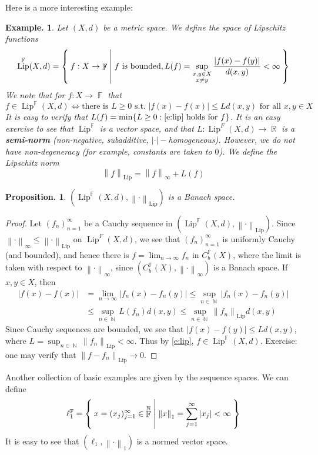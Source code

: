 \documentclass[11pt, a4paper]{memoir}
\DeclareMathOperator{\N}{{\mathbb{N}}}
\DeclareMathOperator{\R}{{\mathbb{R}}}
\DeclareMathOperator{\F}{{\mathbb{F}}}
\newcommand{\norm}[1]{\ensuremath{\left\lVert#1\right\rVert}}
\newcommand{\abs}[1]{\ensuremath{\left\lvert#1\right\rvert}}
\theoremstyle{change}
\newtheorem{proposition}[theorem]{Proposition.}
\theoremstyle{plain}
\theoremstyle{nonumberplain}
\newtheorem{example}{Example.}
\newtheorem{proof}{Proof}
\DeclareMathOperator{\Lip}{Lip}
\numberwithin{equation}{section}
\begin{document}
Here is a more interesting example:
\begin{example}
    Let $(X,d)$ be a metric space.
    We define the space of Lipschitz functions
    \begin{equation*}
        \Lip^{\F}(X,d)=\Set{f:X\to\F | f\text{ is bounded}, L(f)=\sup_{\substack{x,y\in X\\x\neq y}}\frac{|f(x)-f(y)|}{d(x,y)}<\infty}
    \end{equation*}
    We note that for $f:X\to\F$ that
    \begin{equation}\label{e:lip}
        f\in\Lip^{\F}(X,d)\Leftrightarrow\text{there is }L\geq 0\text{ s.t. }|f(x)-f(x)|\leq Ld(x,y)\text{ for all }x,y\in X
    \end{equation}
    It is easy to verify that $L(f)=\min\{L\geq 0:\text{\cref{e:lip} holds for }f\}$.
    It is an easy exercise to see that $\Lip^{\F}$ is a vector space, and that $L:\Lip^{F}(X,d)\to\R$ is a \textbf{semi-norm} (non-negative, subadditive, $\abs{\cdot}-$homogeneous).
    However, we do not have non-degeneracy (for example, constants are taken to $0$).
    We define the Lipschitz norm
    \begin{equation*}
        \norm{f}_{\Lip}=\norm{f}_\infty+L(f)
    \end{equation*}
\end{example}
\begin{proposition}
    $(\Lip^{\F}(X,d),\norm{\cdot}_{\Lip})$ is a Banach space.
\end{proposition}
\begin{proof}
    Let $(f_n)_{n=1}^\infty$ be a Cauchy sequence in $(\Lip^{\F}(X,d),\norm{\cdot}_{\Lip})$.
    Since $\norm{\cdot}_\infty\leq\norm{\cdot}_{\Lip}$ on $\Lip^{F}(X,d)$, we see that $(f_n)_{n=1}^\infty$ is uniformly Cauchy (and bounded), and hence there is $f=\lim_{n\to\infty} f_n$ in $C_b^{\F}(X)$, where the limit is taken with respect to $\norm{\cdot}_\infty$, since $(C_b^{\F}(X),\norm{\cdot}_\infty)$ is a Banach space.
    If $x,y\in X$, then
    \begin{align*}
        |f(x)-f(x)| &= \lim_{n\to\infty}|f_n(x)-f_n(y)|\leq \sup_{n\in\N}|f_n(x)-f_n(y)|\\
                    &\leq \sup_{n\in\N} L(f_n)d(x,y)\leq\sup_{n\in\N}\norm{f_n}_{\Lip} d(x,y)
    \end{align*}
    Since Cauchy sequences are bounded, we see that $|f(x)-f(y)|\leq Ld(x,y)$, where $L=\sup_{n\in\N}\norm{f_n}_{\Lip}<\infty$.
    Thus by \cref{e:lip}, $f\in\Lip^{\F}(X,d)$.
    Exercise: one may verify that $\norm{f-f_n}_{\Lip}\to 0$.
\end{proof}
Another collection of basic examples are given by the sequence spaces.
We can define
\begin{equation*}
    \ell_1^{\F}=\Set{x=(x_j)_{j=1}^\infty\in\F^{\N} | \norm{x}_1=\sum_{j=1}^\infty|x_j|<\infty}
\end{equation*}
It is easy to see that $(\ell_1,\norm{\cdot}_1)$ is a normed vector space.
\end{document}
